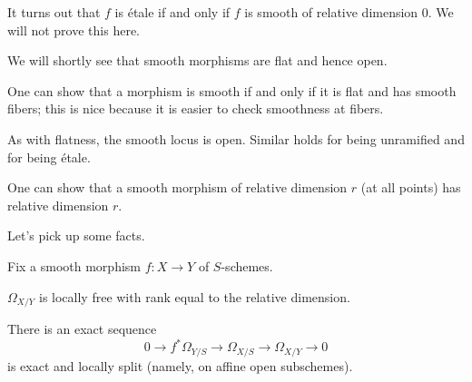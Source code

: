 \documentclass[../notes.tex]{subfiles}
\begin{document}
\begin{remark}
	It turns out that $f$ is \'etale if and only if $f$ is smooth of relative dimension $0$. We will not prove this here.
\end{remark}
\begin{remark}
	We will shortly see that smooth morphisms are flat and hence open.
\end{remark}
\begin{remark}
	One can show that a morphism is smooth if and only if it is flat and has smooth fibers; this is nice because it is easier to check smoothness at fibers.
\end{remark}
\begin{remark}
	As with flatness, the smooth locus is open. Similar holds for being unramified and for being \'etale.
\end{remark}
\begin{remark}
	One can show that a smooth morphism of relative dimension $r$ (at all points) has relative dimension $r$.
\end{remark}
Let's pick up some facts.
\begin{proposition} \label{prop:smooth-tangent-ses}
	Fix a smooth morphism $f\colon X\to Y$ of $S$-schemes.
	\begin{listalph}
		\item $\Omega_{X/Y}$ is locally free with rank equal to the relative dimension.
		\item There is an exact sequence
		\[0\to f^*\Omega_{Y/S}\to\Omega_{X/S}\to\Omega_{X/Y}\to0\]
		is exact and locally split (namely, on affine open subschemes).
	\end{listalph}
\end{proposition}
\end{document}
